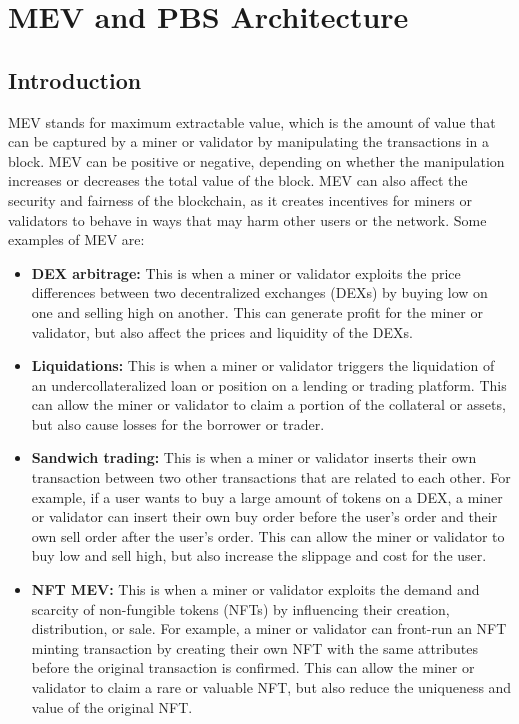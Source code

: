 \chapter{MEV and PBS Architecture}
\section{Introduction}
MEV stands for maximum extractable value, which is the amount of value that can be captured by a miner or validator by manipulating the transactions in a block. MEV can be positive or negative, depending on whether the manipulation increases or decreases the total value of the block. MEV can also affect the security and fairness of the blockchain, as it creates incentives for miners or validators to behave in ways that may harm other users or the network.
Some examples of MEV are:
\begin{itemize}
	\item \textbf{DEX arbitrage:} This is when a miner or validator exploits the price differences between two decentralized exchanges (DEXs) by buying low on one and selling high on another. This can generate profit for the miner or validator, but also affect the prices and liquidity of the DEXs.
	\item \textbf{Liquidations:} This is when a miner or validator triggers the liquidation of an undercollateralized loan or position on a lending or trading platform. This can allow the miner or validator to claim a portion of the collateral or assets, but also cause losses for the borrower or trader.
	\item \textbf{Sandwich trading:} This is when a miner or validator inserts their own transaction between two other transactions that are related to each other. For example, if a user wants to buy a large amount of tokens on a DEX, a miner or validator can insert their own buy order before the user’s order and their own sell order after the user’s order. This can allow the miner or validator to buy low and sell high, but also increase the slippage and cost for the user.
	\item \textbf{NFT MEV:} This is when a miner or validator exploits the demand and scarcity of non-fungible tokens (NFTs) by influencing their creation, distribution, or sale. For example, a miner or validator can front-run an NFT minting transaction by creating their own NFT with the same attributes before the original transaction is confirmed. This can allow the miner or validator to claim a rare or valuable NFT, but also reduce the uniqueness and value of the original NFT.
\end{itemize}
